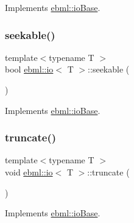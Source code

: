 Implements \mbox{\hyperlink{classebml_1_1ioBase_a413541f633f97d68021cbf58837e1970}{ebml\+::io\+Base}}.

\mbox{\label{classebml_1_1io_ab019a4128b3339941124a12632c919fd}} 
\subsubsection{\texorpdfstring{seekable()}{seekable()}\hspace{0.1cm}{\footnotesize\ttfamily [3/3]}}
{\footnotesize\ttfamily template$<$typename T $>$ \\
bool \mbox{\hyperlink{classebml_1_1io}{ebml\+::io}}$<$ T $>$\+::seekable (\begin{DoxyParamCaption}{ }\end{DoxyParamCaption})\hspace{0.3cm}{\ttfamily [virtual]}}



Implements \mbox{\hyperlink{classebml_1_1ioBase_a413541f633f97d68021cbf58837e1970}{ebml\+::io\+Base}}.

\mbox{\label{classebml_1_1io_a6a5c0f2182844094c6b4432a15adccc8}} 
\subsubsection{\texorpdfstring{truncate()}{truncate()}\hspace{0.1cm}{\footnotesize\ttfamily [1/2]}}
{\footnotesize\ttfamily template$<$typename T $>$ \\
void \mbox{\hyperlink{classebml_1_1io}{ebml\+::io}}$<$ T $>$\+::truncate (\begin{DoxyParamCaption}{ }\end{DoxyParamCaption})\hspace{0.3cm}{\ttfamily [virtual]}}



Implements \mbox{\hyperlink{classebml_1_1ioBase_a4cd6d91c2bb18a21c0fec425432b58c3}{ebml\+::io\+Base}}.

\mbox{\label{classebml_1_1io_a9a50a99136e7e9a4a404dc3087024a7f}} 
